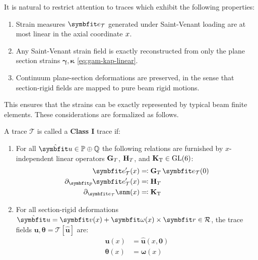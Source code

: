 It is natural to restrict attention to traces which exhibit the following properties:
\begin{enumerate}
    \item Strain measures \(\TraceStrain\) generated under Saint-Venant loading are at most linear in the axial coordinate $x$. 
    \item Any Saint-Venant strain field is exactly reconstructed from only the plane section strains \(\bm{\gamma},\bm{\kappa}\) \eqref{eq:gam-kap-linear}.
    \item Continuum plane-section deformations are preserved, in the sense that section‑rigid fields are mapped to pure beam rigid motions.
\end{enumerate}
This ensures that the strains can be exactly represented by typical beam finite elements. 
These considerations are formalized as follows.

\begin{definition}[Class I]\label{def:class-1} %
A trace \(\mathcal{T}\) is called a \textbf{Class I} trace if:
\begin{enumerate}[label=(\roman*)]
    \item For all \(\hat{\bm u} \in \IesanMotions\oplus \RigidMotions\) the following relations are furnished by $x$-independent linear operators \(\mathbf{G}_T\), \({\mathbf{H}}_T\), and \(\mathbf{K}_{\rm T}\in\mathrm{GL}(6)\):
    \begin{subequations}
    \begin{align}
        \TraceStrain'(x) & \eqqcolon \TraceEvolveEE\,\TraceStrain(0) 
        \label{eq:req-t1} 
        \\ 
        \partial_{\IesanVector}\TraceStrain'(x) &\eqqcolon \TraceDeDpOne 
        \label{eq:req-d1}
        \\ 
        \partial_{\TraceStrain} \snm(x) &\eqqcolon \TraceStiffNM 
        \label{eq:req-c1}
    \end{align}
    \label{eq:class-i-a}
    \end{subequations}

    \item For all section-rigid deformations \(\hat{\bm u} =\bm{v}(x)+\bm{\omega}(x)\times\bm{r} \in \PlaneMotions\), the trace fields \(\bm{u},\bm{\theta} = \mathcal{T} [\hat{\bm u}]\) are:
    \begin{subequations}
    \begin{align}
        \bm{u}(x) &= \hat{\bm u}(x,\mathbf{0}) \\
        \bm{\theta}(x) &= \bm{\omega}(x)
    \end{align}
    \label{eq:req-p1}
    \end{subequations}
\end{enumerate}
\end{definition}
%

